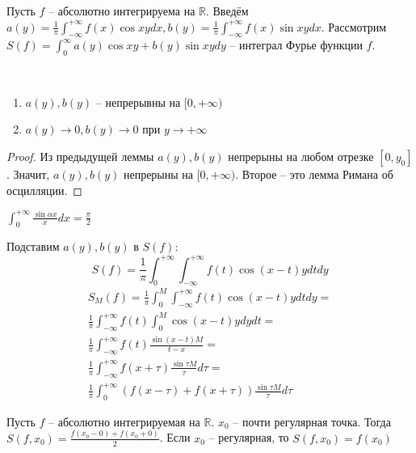 \documentclass[document.tex]{subfiles}
\begin{document}
\begin{definition}
    Пусть $f$ -- абсолютно интегрируема на $\mathbb{R}$. Введём $a(y) = \frac{1}{\pi} \int_{-\infty}^{+\infty}f(x) \cos
    xy dx, b(y) = \frac{1}{\pi} \int_{-\infty}^{+\infty} f(x) \sin xy dx$. Рассмотрим $S(f) = \int_{0}^{\infty}a(y) \cos
    xy + b(y) \sin xy dy$ -- интеграл Фурье функции $f$.
\end{definition}

\begin{lemma}
    ~\begin{enumerate}
        \item $a(y), b(y)$ -- непрерывны на $[0, + \infty)$
        \item $a(y) \rightarrow 0, b(y) \rightarrow 0$ при $y \rightarrow +\infty$
    \end{enumerate}
\end{lemma}
\begin{proof}
    Из предыдущей леммы $a(y), b(y)$ непрерыны на любом отрезке $[0, y_0]$. Значит, $a(y), b(y)$ непрерыны на
    $[0, +\infty)$. Второе -- это лемма Римана об осцилляции.
\end{proof}

\begin{statement}
    $\int_{0}^{+\infty} \frac{\sin \alpha x}{x}dx = \frac{\pi}{2}$
\end{statement}

Подставим $a(y), b(y)$ в $S(f)$:
\[
    S(f) = \frac{1}{\pi}\int_{0}^{+\infty} \int_{-\infty}^{+\infty}f(t) \cos (x - t)y dt dy
\]
\begin{multline*}
    S_M(f) = \frac{1}{\pi}\int_{0}^{M} \int_{-\infty}^{+ \infty}f(t) \cos (x - t)y dt dy = \\
    \frac{1}{\pi} \int_{-\infty}^{+ \infty} f(t) \int_{0}^{M} \cos (x - t)y dy dt = \\
    \frac{1}{\pi} \int_{-\infty}^{+\infty} f(t) \frac{\sin (x - t)M}{t - x} = \\
    \frac{1}{\pi} \int_{-\infty}^{+\infty} f(x + \tau) \frac{\sin \tau M}{\tau}d\tau = \\
    \frac{1}{\pi} \int_{0}^{+\infty} (f(x - \tau) + f(x + \tau)) \frac{\sin \tau M}{\tau}d\tau 
\end{multline*}

\begin{theorem}
    Пусть $f$ -- абсолютно интегрируемая на $\mathbb{R}$. $x_0$ -- почти регулярная точка. Тогда $S(f, x_0) =
    \frac{f(x_0 - 0) + f(x_0 + 0)}{2}$. Если $x_0$ -- регулярная, то $S(f, x_0) = f(x_0)$
\end{theorem}
\end{document}
